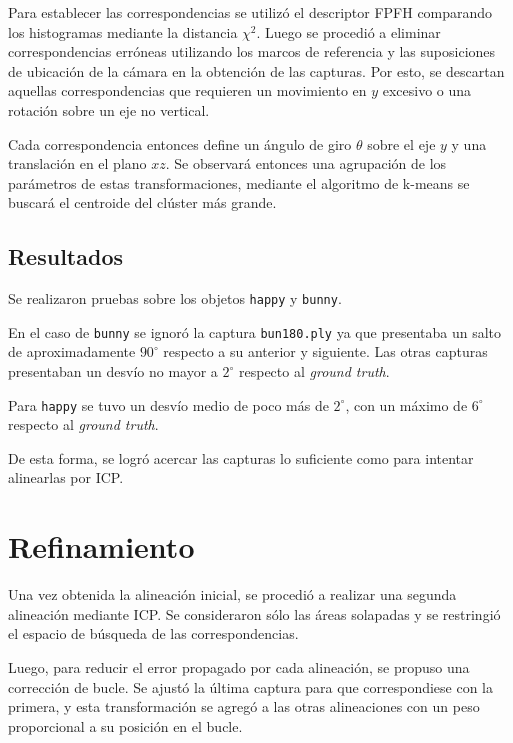 		Para establecer las correspondencias se utilizó el descriptor FPFH
		comparando los histogramas mediante la distancia $\chi^2$.  Luego se
		procedió a eliminar correspondencias erróneas utilizando los marcos de
		referencia y las suposiciones de ubicación de la cámara en la obtención
		de las capturas.  Por esto, se descartan aquellas correspondencias que
		requieren un movimiento en $y$ excesivo o una rotación sobre un eje no
		vertical. 

		Cada correspondencia entonces define un ángulo de giro $\theta$ sobre
		el eje $y$ y una translación en el plano $xz$.  Se observará entonces
		una agrupación de los parámetros de estas transformaciones, mediante el
		algoritmo de k-means se buscará el centroide del clúster más grande.

		\subsection{Resultados}
			Se realizaron pruebas sobre los objetos \texttt{happy} y \texttt{bunny}.

			En el caso de \texttt{bunny} se ignoró la captura
			\texttt{bun180.ply} ya que presentaba un salto de aproximadamente
			$90^{\circ}$ respecto a su anterior y siguiente.  Las otras
			capturas presentaban un desvío no mayor a $2^{\circ}$ respecto al
			\emph{ground truth}.

			Para \texttt{happy} se tuvo un desvío medio de poco más de
			$2^{\circ}$, con un máximo de $6^{\circ}$ respecto al \emph{ground truth}.

			De esta forma, se logró acercar las capturas lo suficiente como
			para intentar alinearlas por ICP.


	\section{Refinamiento}
	Una vez obtenida la alineación inicial, se procedió a realizar una segunda
	alineación mediante ICP.
	Se consideraron sólo las áreas solapadas y se restringió el
	espacio de búsqueda de las correspondencias.

	Luego, para reducir el error propagado por cada alineación, se propuso una
	corrección de bucle.
	Se ajustó la última captura para que correspondiese con la primera, y
	esta transformación se agregó a las otras alineaciones con un peso
	proporcional a su posición en el bucle.



